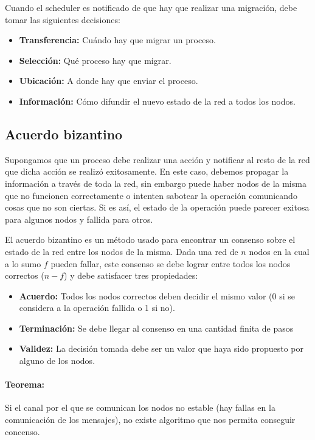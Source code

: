 Cuando el scheduler es notificado de que hay que realizar una migración, debe tomar las siguientes decisiones:
\begin{itemize}
	\item \textbf{Transferencia:} Cuándo hay que migrar un proceso.
	\item \textbf{Selección:} Qué proceso hay que migrar.
	\item \textbf{Ubicación:} A donde hay que enviar el proceso.
	\item \textbf{Información:} Cómo difundir el nuevo estado de la red a todos los nodos.
\end{itemize} 

\subsection{Acuerdo bizantino}
Supongamos que un proceso debe realizar una acción y notificar al resto de la red que dicha acción se realizó exitosamente. En este caso, debemos propagar la información a través de toda la red, sin embargo puede haber nodos de la misma que no funcionen correctamente o intenten sabotear la operación comunicando cosas que no son ciertas. Si es así, el estado de la operación puede parecer exitosa para algunos nodos y fallida para otros.

El acuerdo bizantino es un método usado para encontrar un consenso sobre el estado de la red entre los nodos de la misma. Dada una red de $n$ nodos en la cual a lo sumo $f$ pueden fallar, este consenso se debe lograr entre todos los nodos correctos ($n-f$) y debe satisfacer tres propiedades:
\begin{itemize}
	\item \textbf{Acuerdo:} Todos los nodos correctos deben decidir el mismo valor (0 si se considera a la operación fallida o 1 si no).
	\item \textbf{Terminación:} Se debe llegar al consenso en una cantidad finita de pasos
	\item \textbf{Validez:} La decisión tomada debe ser un valor que haya sido propuesto por alguno de los nodos.
\end{itemize}

\paragraph{Teorema:} Si el canal por el que se comunican los nodos no estable (hay fallas en la comunicación de los mensajes), no existe algoritmo que nos permita conseguir concenso.

